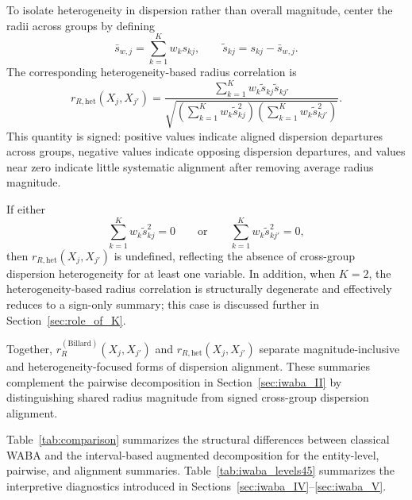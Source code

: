 \documentclass[preprint, times, 12pt, authoryear]{elsarticle}
\begin{document}
To isolate heterogeneity in dispersion rather than overall magnitude, center the radii across groups by defining
\[
\bar s_{w,j}=\sum_{k=1}^K w_k s_{kj},
\qquad
\tilde s_{kj}=s_{kj}-\bar s_{w,j}.
\]
The corresponding heterogeneity-based radius correlation is
\begin{equation}\label{eq:r_radius_het}
	r_{R,\mathrm{het}}(X_j,X_{j'})
	=
	\frac{\sum_{k=1}^K w_k \tilde s_{kj}\tilde s_{kj'}}
	{\sqrt{\left(\sum_{k=1}^K w_k \tilde s_{kj}^2\right)\left(\sum_{k=1}^K w_k \tilde s_{kj'}^2\right)}}.
\end{equation}
This quantity is signed: positive values indicate aligned dispersion departures across groups, negative values indicate opposing dispersion departures, and values near zero indicate little systematic alignment after removing average radius magnitude.

If either
\[
\sum_{k=1}^K w_k \tilde s_{kj}^2=0
\qquad\text{or}\qquad
\sum_{k=1}^K w_k \tilde s_{kj'}^2=0,
\]
then \(r_{R,\mathrm{het}}(X_j,X_{j'})\) is undefined, reflecting the absence of cross-group dispersion heterogeneity for at least one variable. In addition, when \(K=2\), the heterogeneity-based radius correlation is structurally degenerate and effectively reduces to a sign-only summary; this case is discussed further in Section~\ref{sec:role_of_K}.

Together, \(r_{R}^{(\mathrm{Billard})}(X_j,X_{j'})\) and \(r_{R,\mathrm{het}}(X_j,X_{j'})\) separate magnitude-inclusive and heterogeneity-focused forms of dispersion alignment. These summaries complement the pairwise decomposition in Section~\ref{sec:iwaba_II} by distinguishing shared radius magnitude from signed cross-group dispersion alignment.

Table~\ref{tab:comparison} summarizes the structural differences between classical WABA and the interval-based augmented decomposition for the entity-level, pairwise, and alignment summaries. Table~\ref{tab:iwaba_levels45} summarizes the interpretive diagnostics introduced in Sections~\ref{sec:iwaba_IV}--\ref{sec:iwaba_V}.
\end{document}
